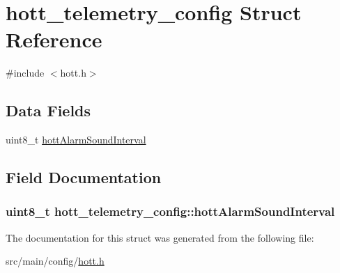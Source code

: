 \hypertarget{structhott__telemetry__config}{\section{hott\+\_\+telemetry\+\_\+config Struct Reference}
\label{structhott__telemetry__config}
}


{\ttfamily \#include $<$hott.\+h$>$}

\subsection*{Data Fields}
\begin{DoxyCompactItemize}
\item 
uint8\+\_\+t \hyperlink{structhott__telemetry__config_a4327cc2d0a6add066455374a9e0bf3b6}{hott\+Alarm\+Sound\+Interval}
\end{DoxyCompactItemize}


\subsection{Field Documentation}
\hypertarget{structhott__telemetry__config_a4327cc2d0a6add066455374a9e0bf3b6}{
\subsubsection[{hott\+Alarm\+Sound\+Interval}]{\setlength{\rightskip}{0pt plus 5cm}uint8\+\_\+t hott\+\_\+telemetry\+\_\+config\+::hott\+Alarm\+Sound\+Interval}}\label{structhott__telemetry__config_a4327cc2d0a6add066455374a9e0bf3b6}


The documentation for this struct was generated from the following file\+:\begin{DoxyCompactItemize}
\item 
src/main/config/\hyperlink{config_2hott_8h}{hott.\+h}\end{DoxyCompactItemize}
